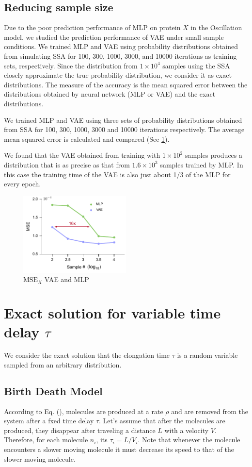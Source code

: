 \documentclass[a4paper,10pt]{article}
\begin{document}
\subsection{Reducing sample size}
Due to the poor prediction performance of MLP\cite{jiang2021neural} on protein $X$ in the Oscillation model, we studied the prediction performance of VAE under small sample conditions. We trained MLP and VAE using probability distributions obtained from simulating SSA for 100, 300, 1000, 3000, and 10000 iterations as training sets, respectively. Since the distribution from  $1 \times 10^4$ samples using the SSA closely approximate the true probability distribution, we consider it as exact distributions. The measure of the accuracy is the mean squared error between the distributions obtained by neural network (MLP or VAE) and the exact distributions.

We trained MLP and VAE using three sets of probability distributions obtained from SSA for 100, 300, 1000, 3000 and 10000 iterations respectively. The average mean squared error is calculated and compared (See \ref{MSE_VAE_MLP}).

We found that the VAE obtained from training with $1 \times 10^2$ samples produces a distribution that is as precise as that from $1.6 \times 10^3$ samples trained by MLP. In this case the training time of the VAE is also just about 1/3 of the MLP for every epoch.
\begin{figure}[h]
	\centering
	\includegraphics[width=0.5\textwidth]{Figs/MSE_VAE_MLP.pdf}
	\caption{$\text{MSE}_X$ VAE and MLP}\label{MSE_VAE_MLP}  
\end{figure}
\newpage

\section{Exact solution for variable time delay $\tau$}
We consider the exact solution that the elongation time $\tau$ is a random variable sampled from an arbitrary distribution.
\subsection{Birth Death Model}
According to Eq. (), molecules are produced at a rate $\rho$ and are removed from the system after a fxed time delay $\tau$. Let's assume that after the molecules are produced, they disappear after traveling a distance $L$ with a velocity $V$. Therefore, for each molecule $n_i$, its $\tau_i=L/V_i$. Note that whenever the molecule encounters a slower moving molecule it must decrease its speed to that of the slower moving molecule.
\end{document}
